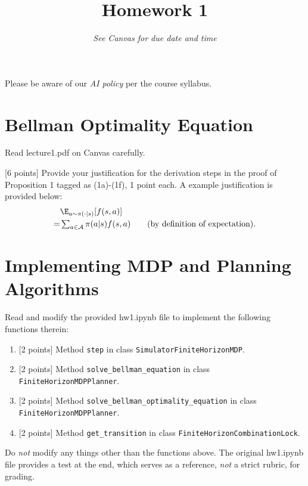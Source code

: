 \title{Homework 1}
\date{{\em See Canvas for due date and time}}

    

Please be aware of our {\em AI policy} per the course syllabus.

\section{Bellman Optimality Equation}
Read lecture1.pdf on Canvas carefully. 

{[6 points]} Provide your justification for the derivation steps in the proof of Proposition 1 tagged as (1a)-(1f), 1 point each.
A example justification is provided below:
\begin{align*}
      &\E_{a\sim\pi(\cdot|s)}[f(s,a)] \\
    = &\textstyle\sum_{a\in\mathcal{A}} \pi(a|s) f(s,a)\qquad\text{(by definition of expectation)}
    .
\end{align*}

\section{Implementing MDP and Planning Algorithms}
Read and modify the provided hw1.ipynb file to implement the following functions therein:
\begin{enumerate}[label=(\alph*)]
\item {[2 points]} Method \texttt{step} in class \texttt{SimulatorFiniteHorizonMDP}.
\item {[2 points]} Method \texttt{solve\_bellman\_equation} in class \texttt{FiniteHorizonMDPPlanner}.
\item {[2 points]} Method \texttt{solve\_bellman\_optimality\_equation} in class \texttt{FiniteHorizonMDPPlanner}.
\item {[2 points]} Method \texttt{get\_transition} in class \texttt{FiniteHorizonCombinationLock}.
\end{enumerate}
Do {\em not} modify any things other than the functions above. 
The original hw1.ipynb file provides a test at the end, which serves as a reference, {\em not} a strict rubric, for grading.

